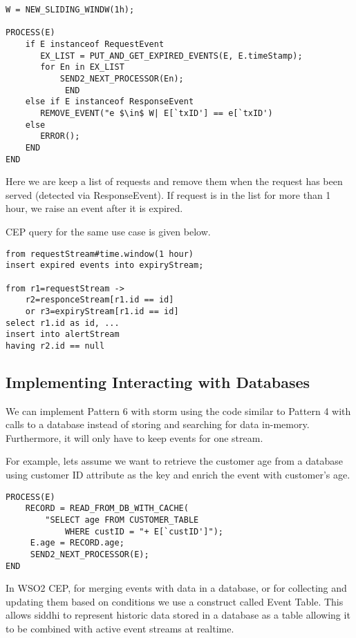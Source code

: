 \documentclass{sig-alternate}
\begin{document}
{\begin{lstlisting}[mathescape, showstringspaces=false]
W = NEW_SLIDING_WINDW(1h); 

PROCESS(E)  
    if E instanceof RequestEvent
       EX_LIST = PUT_AND_GET_EXPIRED_EVENTS(E, E.timeStamp);
       for En in EX_LIST
           SEND2_NEXT_PROCESSOR(En); 
			END        
    else if E instanceof ResponseEvent
       REMOVE_EVENT("e $\in$ W| E[`txID'] == e[`txID') 
    else 
       ERROR();
    END   
END 
\end{lstlisting}


Here we are keep a list of requests and remove them when the request has been served (detected via ResponseEvent). If request is in the list for more than 1 hour, we raise an event after it is expired. 

CEP query for the same use case is given below. 

\begin{lstlisting}[mathescape, showstringspaces=false]
from requestStream#time.window(1 hour)
insert expired events into expiryStream;

from r1=requestStream -> 
	r2=responceStream[r1.id == id] 
	or r3=expiryStream[r1.id == id]
select r1.id as id, ...
insert into alertStream 
having r2.id == null
\end{lstlisting}



\subsection{Implementing Interacting with Databases}
We can implement Pattern 6 with storm using the code similar to Pattern 4 with calls to a database instead of storing and searching for data in-memory. Furthermore, it will only have to keep events for one stream. 

For example, lets assume we want to retrieve the customer age from a database using customer ID attribute as the key and enrich the event with customer's age. 


\begin{lstlisting}[mathescape, showstringspaces=false]
PROCESS(E) 
	RECORD = READ_FROM_DB_WITH_CACHE(
		"SELECT age FROM CUSTOMER_TABLE 
			WHERE custID = "+ E[`custID']");    
	 E.age = RECORD.age;
	 SEND2_NEXT_PROCESSOR(E); 
END   
\end{lstlisting}



In WSO2 CEP, for merging events with data in a database, or for collecting and updating them based on conditions we use a construct called Event Table. This allows siddhi to represent historic data stored in a database as a table allowing it to be combined with active event streams at realtime. 

}
\end{document}
